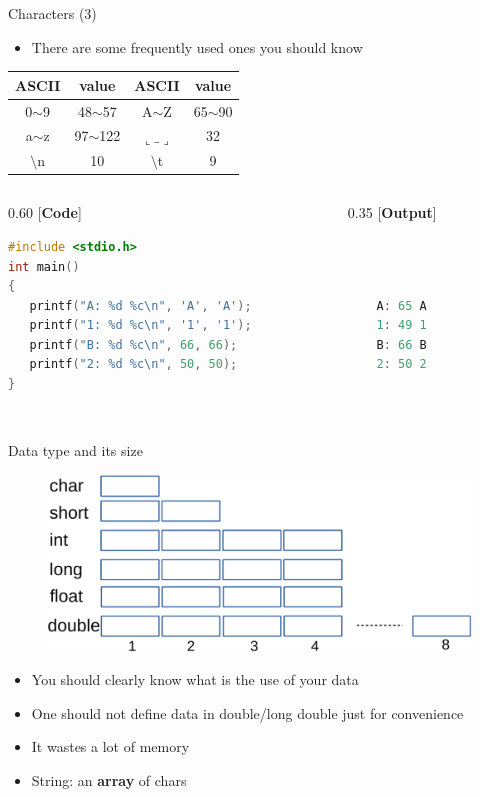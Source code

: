 \begin{frame}[fragile]{Characters (3)}
	\begin{itemize}
		\item {There are some frequently used ones you should know}
	\end{itemize}
\begin{table}
\begin{tabular}{|c|c||c|c|}
\hline
ASCII & value & ASCII & value  \\ \hline
0$\sim$9 & 48$\sim$57 & A$\sim$Z & 65$\sim$90 \\ \hline
 a$\sim$z & 97$\sim$122 & $\llcorner\_\lrcorner$ & 32 \\ \hline
$\setminus$n & 10 & $\setminus$t & 9 \\ \hline
\end{tabular}
\end{table}
\begin{columns}
\begin{column}{0.60\linewidth}
	[\textbf{Code}]
	\begin{lstlisting}[language=c, numbers=none]
#include <stdio.h>
int main()
{
   printf("A: %d %c\n", 'A', 'A');
   printf("1: %d %c\n", '1', '1');
   printf("B: %d %c\n", 66, 66);
   printf("2: %d %c\n", 50, 50);
}
	\end{lstlisting}
\end{column}
\begin{column}{0.35\linewidth}
	[\textbf{Output}]
	\begin{lstlisting}[language=c, numbers=none]
	
	
	
	A: 65 A
	1: 49 1
	B: 66 B
	2: 50 2
	
	
	\end{lstlisting}
\end{column}
\end{columns}
\end{frame}

\begin{frame}[fragile]{Data type and its size}
\begin{figure}
	\includegraphics[width=0.85\linewidth]{figs/types.pdf}
\end{figure}
\begin{itemize}
	\item {You should clearly know what is the use of your data}
	\item {One should not define data in double/long double just for convenience}
	\item {It wastes a lot of memory}
	\item {String: an \textbf{array} of chars}
\end{itemize}
\end{frame}